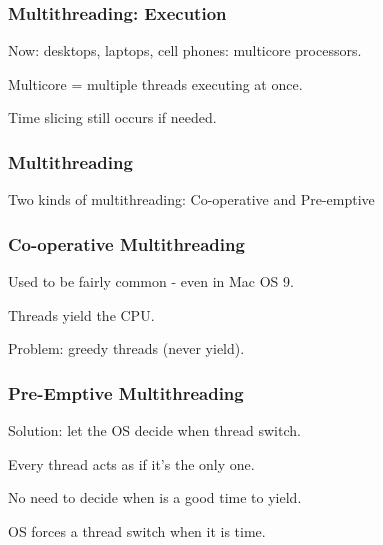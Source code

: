 \begin{frame}
\frametitle{Multithreading: Execution}
\begin{changemargin}{1cm}
Now: desktops, laptops, cell phones: multicore processors.

Multicore = multiple threads executing at once.

Time slicing still occurs if needed. 

\end{changemargin}
\end{frame}

\begin{frame}
\frametitle{Multithreading}
\begin{changemargin}{1cm}

Two kinds of multithreading: \alert{Co-operative} and \alert{Pre-emptive}

\end{changemargin}
\end{frame}


\begin{frame}
\frametitle{Co-operative Multithreading}
\begin{changemargin}{1cm}

Used to be fairly common - even in Mac OS 9.

Threads yield the CPU.

Problem: greedy threads (never yield). 

\end{changemargin}
\end{frame}

\begin{frame}
\frametitle{Pre-Emptive Multithreading}
\begin{changemargin}{1cm}

Solution: let the OS decide when thread switch.

Every thread acts as if it's the only one.

No need to decide when is a good time to yield.

OS forces a thread switch when it is time.

\end{changemargin}
\end{frame}

